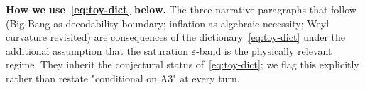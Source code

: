\medskip\noindent\textbf{How we use~\eqref{eq:toy-dict} below.}\;
The three narrative paragraphs that follow (Big Bang as decodability
boundary; inflation as algebraic necessity; Weyl curvature revisited)
are consequences of the dictionary~\eqref{eq:toy-dict} under the
additional assumption that the saturation $\varepsilon$-band is the
physically relevant regime. They inherit the conjectural status
of~\eqref{eq:toy-dict}; we flag this explicitly rather than restate
"conditional on A3" at every turn.
